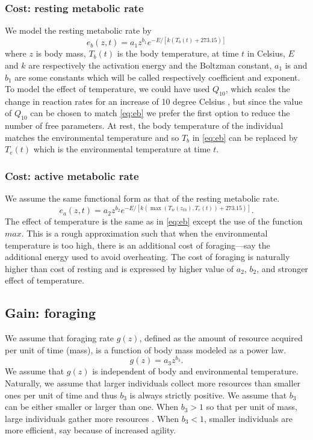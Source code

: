 \subsubsection*{Cost: resting metabolic rate}
We model the resting metabolic rate by
\begin{equation} \label{eq:eb}
	e_b(z, t) = a_1 z^{b_1} e^{-E/[k (T_b(t)+ 273.15)]}
\end{equation}
where $z$ is body mass, $T_b(t)$ is the body temperature, at time $t$ in Celsius, $E$ and $k$ are respectively the activation energy and the Boltzman constant, $a_1$ is and $b_1$ are some constants which will be called respectively coefficient and exponent.
To model the effect of temperature, we could have used $Q_{10}$, which scales the change in reaction rates for an increase of 10 degree Celsius \citep{Precht1973}, but since the value of $Q_{10}$ can be chosen to match \cref{eq:eb} we prefer the first option to reduce the number of free parameters.
At rest, the body temperature of the individual matches the environmental temperature \citep{Bartholomew1978} and so $T_b$ in \cref{eq:eb} can be replaced by $T_e(t)$ which is the environmental temperature at time $t$.


\subsubsection*{Cost: active metabolic rate}
We assume the same functional form as that of the resting metabolic rate.
\begin{equation} \label{eq:ea}
	e_a(z,t) = a_2 z^{b_2}  e^{-E/[k (\max(T_w(z_{th}), T_e(t))+ 273.15)]}.
\end{equation}
The effect of temperature is the same as in \cref{eq:eb} except the use of the function $max$.
This is a rough approximation such that when the environmental temperature is too high, there is an additional cost of foraging---say the additional energy used to avoid overheating. 
The cost of foraging is naturally higher than cost of resting and is expressed by higher value of $a_2$, $b_2$, and stronger effect of temperature.

\subsection*{Gain: foraging}
We assume that foraging rate $g(z)$, defined as the amount of resource acquired per unit of time (mass), is a function of body mass modeled as a power law. 
\[
	g(z) = a_3 z^{b_3}.
\] 
We assume that $g(z)$ is independent of body and environmental temperature.
Naturally, we assume that larger individuals collect more resources than smaller ones per unit of time and thus $b_3$  is always strictly positive.
We assume that $b_3$ can be either smaller or larger than one.
When $b_3 > 1$ so that per unit of mass, large individuals gather more resources \citep[e.g.][]{Nervo2014}.
When $b_3 < 1$, smaller individuals are more efficient, say because of increased agility. %

